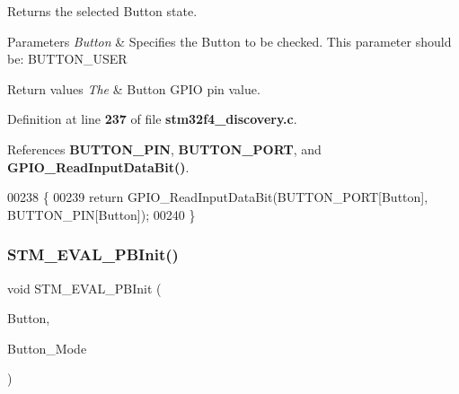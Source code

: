 Returns the selected Button state. 


\begin{DoxyParams}{Parameters}
{\em Button} & Specifies the Button to be checked. This parameter should be\+: B\+U\+T\+T\+O\+N\+\_\+\+U\+S\+ER \\
\hline
\end{DoxyParams}

\begin{DoxyRetVals}{Return values}
{\em The} & Button G\+P\+IO pin value. \\
\hline
\end{DoxyRetVals}


Definition at line \textbf{ 237} of file \textbf{ stm32f4\+\_\+discovery.\+c}.



References \textbf{ B\+U\+T\+T\+O\+N\+\_\+\+P\+IN}, \textbf{ B\+U\+T\+T\+O\+N\+\_\+\+P\+O\+RT}, and \textbf{ G\+P\+I\+O\+\_\+\+Read\+Input\+Data\+Bit()}.


\begin{DoxyCode}
00238 \{
00239   \textcolor{keywordflow}{return} GPIO_ReadInputDataBit(BUTTON_PORT[Button], BUTTON_PIN[Button]);
00240 \}
\end{DoxyCode}
\mbox{\label{group__STM32F4__DISCOVERY__LOW__LEVEL__Private__Functions_ga1cdc19fe328ddcd17bf50fcb62d78369}} 
\subsubsection{S\+T\+M\+\_\+\+E\+V\+A\+L\+\_\+\+P\+B\+Init()}
{\footnotesize\ttfamily void S\+T\+M\+\_\+\+E\+V\+A\+L\+\_\+\+P\+B\+Init (\begin{DoxyParamCaption}\item[{\textbf{ Button\+\_\+\+Type\+Def}}]{Button,  }\item[{\textbf{ Button\+Mode\+\_\+\+Type\+Def}}]{Button\+\_\+\+Mode }\end{DoxyParamCaption})}




